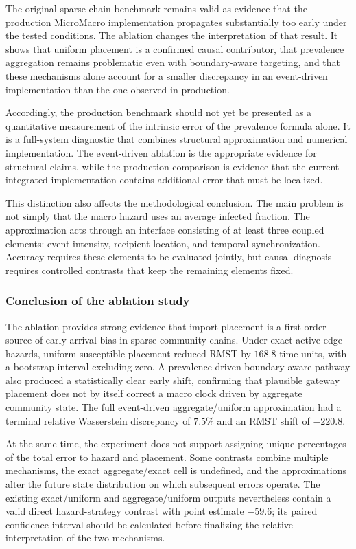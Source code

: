 The original sparse-chain benchmark remains valid as evidence that the production MicroMacro implementation propagates substantially too early under the tested conditions.  The ablation changes the interpretation of that result.  It shows that uniform placement is a confirmed causal contributor, that prevalence aggregation remains problematic even with boundary-aware targeting, and that these mechanisms alone account for a smaller discrepancy in an event-driven implementation than the one observed in production.

Accordingly, the production benchmark should not yet be presented as a quantitative measurement of the intrinsic error of the prevalence formula alone.  It is a full-system diagnostic that combines structural approximation and numerical implementation.  The event-driven ablation is the appropriate evidence for structural claims, while the production comparison is evidence that the current integrated implementation contains additional error that must be localized.

This distinction also affects the methodological conclusion.  The main problem is not simply that the macro hazard uses an average infected fraction.  The approximation acts through an interface consisting of at least three coupled elements: event intensity, recipient location, and temporal synchronization.  Accuracy requires these elements to be evaluated jointly, but causal diagnosis requires controlled contrasts that keep the remaining elements fixed.

\subsubsection{Conclusion of the ablation study}
\label{sec:hazard_placement_conclusion}

The ablation provides strong evidence that import placement is a first-order source of early-arrival bias in sparse community chains.  Under exact active-edge hazards, uniform susceptible placement reduced RMST by $168.8$ time units, with a bootstrap interval excluding zero.  A prevalence-driven boundary-aware pathway also produced a statistically clear early shift, confirming that plausible gateway placement does not by itself correct a macro clock driven by aggregate community state.  The full event-driven aggregate/uniform approximation had a terminal relative Wasserstein discrepancy of $7.5\%$ and an RMST shift of $-220.8$.

At the same time, the experiment does not support assigning unique percentages of the total error to hazard and placement.  Some contrasts combine multiple mechanisms, the exact aggregate/exact cell is undefined, and the approximations alter the future state distribution on which subsequent errors operate.  The existing exact/uniform and aggregate/uniform outputs nevertheless contain a valid direct hazard-strategy contrast with point estimate $-59.6$; its paired confidence interval should be calculated before finalizing the relative interpretation of the two mechanisms.

